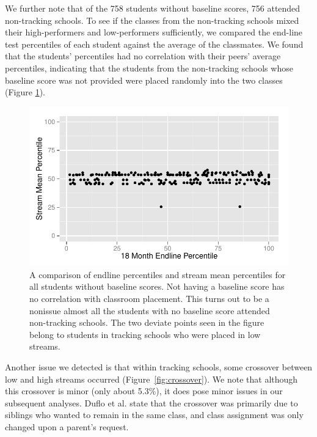 \documentclass[11pt]{article}
\begin{document}
We further note that of the 758 students without baseline scores, 756 attended non-tracking schools.  To see if the classes from the non-tracking schools mixed their high-performers and low-performers sufficiently, we compared the end-line test percentiles of each student against the average of the classmates. We found that the students' percentiles had no correlation with their peers' average percentiles, indicating that the students from the non-tracking schools whose baseline score was not provided were placed randomly into the two classes (Figure \ref{fig:NoBaselinePercentile}).

  \begin{figure}[H]
  	\centering
  	\includegraphics[scale=0.8]{../Figures/NoBaselinePercentile.pdf}
  	\caption{A comparison of endline percentiles and stream mean percentiles for all students without baseline scores.  Not having a baseline score has no correlation with classroom placement.  This turns out to be a nonissue almost all the students with no baseline score attended non-tracking schools.  The two deviate points seen in the figure belong to students in tracking schools who were placed in low streams.}
  	\label{fig:NoBaselinePercentile}
  \end{figure} 

Another issue we detected is that within tracking schools, some crossover between low and high streams occurred (Figure~\ref{fig:crossover}). We note that although this crossover is minor (only about 5.3\%), it does pose minor issues in our subsequent analyses. Duflo et al. state that the crossover was primarily due to siblings who wanted to remain in the same class, and class assignment was only changed upon a parent's request.

 
 
\end{document}
